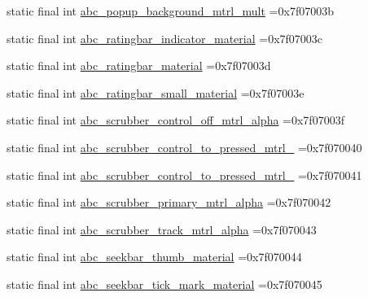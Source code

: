 \begin{DoxyCompactItemize}
\item 
static final int \mbox{\hyperlink{classcom_1_1example_1_1trainawearapplication_1_1_r_1_1drawable_ad3ba91791e752d6cf283bdbe030b3cb7}{abc\+\_\+popup\+\_\+background\+\_\+mtrl\+\_\+mult}} =0x7f07003b
\item 
static final int \mbox{\hyperlink{classcom_1_1example_1_1trainawearapplication_1_1_r_1_1drawable_a10e687a632f1be62f8a54c9a55d06ddd}{abc\+\_\+ratingbar\+\_\+indicator\+\_\+material}} =0x7f07003c
\item 
static final int \mbox{\hyperlink{classcom_1_1example_1_1trainawearapplication_1_1_r_1_1drawable_aba5155d09701f60a1d21dbc7739e7090}{abc\+\_\+ratingbar\+\_\+material}} =0x7f07003d
\item 
static final int \mbox{\hyperlink{classcom_1_1example_1_1trainawearapplication_1_1_r_1_1drawable_a118c7c512674a3a00c406fb64bf5a363}{abc\+\_\+ratingbar\+\_\+small\+\_\+material}} =0x7f07003e
\item 
static final int \mbox{\hyperlink{classcom_1_1example_1_1trainawearapplication_1_1_r_1_1drawable_a239ad8cb32b11092746f1dfa207a83f9}{abc\+\_\+scrubber\+\_\+control\+\_\+off\+\_\+mtrl\+\_\+alpha}} =0x7f07003f
\item 
static final int \mbox{\hyperlink{classcom_1_1example_1_1trainawearapplication_1_1_r_1_1drawable_a6913e992ba5300cc807509243393bee2}{abc\+\_\+scrubber\+\_\+control\+\_\+to\+\_\+pressed\+\_\+mtrl\+\_}} =0x7f070040
\item 
static final int \mbox{\hyperlink{classcom_1_1example_1_1trainawearapplication_1_1_r_1_1drawable_ab777143f7f8751ebc687d42831eee298}{abc\+\_\+scrubber\+\_\+control\+\_\+to\+\_\+pressed\+\_\+mtrl\+\_}} =0x7f070041
\item 
static final int \mbox{\hyperlink{classcom_1_1example_1_1trainawearapplication_1_1_r_1_1drawable_a32728a8e0cae1a17f4d30f07c16798df}{abc\+\_\+scrubber\+\_\+primary\+\_\+mtrl\+\_\+alpha}} =0x7f070042
\item 
static final int \mbox{\hyperlink{classcom_1_1example_1_1trainawearapplication_1_1_r_1_1drawable_a0f2026761d2295ccdd425d5968220c52}{abc\+\_\+scrubber\+\_\+track\+\_\+mtrl\+\_\+alpha}} =0x7f070043
\item 
static final int \mbox{\hyperlink{classcom_1_1example_1_1trainawearapplication_1_1_r_1_1drawable_ab9853cd02f3f6d06a03e67b90f24e71e}{abc\+\_\+seekbar\+\_\+thumb\+\_\+material}} =0x7f070044
\item 
static final int \mbox{\hyperlink{classcom_1_1example_1_1trainawearapplication_1_1_r_1_1drawable_ab7093b3325fc86c10aebac427b0ba61b}{abc\+\_\+seekbar\+\_\+tick\+\_\+mark\+\_\+material}} =0x7f070045

\end{DoxyCompactItemize}
